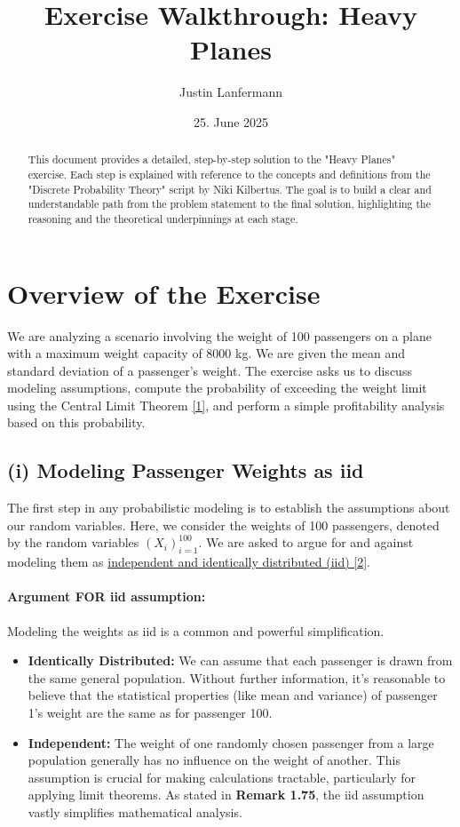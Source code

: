\documentclass[11pt,a4paper]{article}
\title{Exercise Walkthrough: Heavy Planes}
\author{Justin Lanfermann}
\date{25. June 2025}
\begin{document}
\maketitle

\begin{abstract}
    This document provides a detailed, step-by-step solution to the "Heavy Planes" exercise. Each step is explained with reference to the concepts and definitions from the "Discrete Probability Theory" script by Niki Kilbertus. The goal is to build a clear and understandable path from the problem statement to the final solution, highlighting the reasoning and the theoretical underpinnings at each stage.
\end{abstract}

\section*{Overview of the Exercise}
We are analyzing a scenario involving the weight of 100 passengers on a plane with a maximum weight capacity of 8000 kg. We are given the mean and standard deviation of a passenger's weight. The exercise asks us to discuss modeling assumptions, compute the probability of exceeding the weight limit using the Central Limit Theorem \hyperlink{concept:clt}{[1]}, and perform a simple profitability analysis based on this probability.

\subsection*{(i) Modeling Passenger Weights as iid}
The first step in any probabilistic modeling is to establish the assumptions about our random variables. Here, we consider the weights of 100 passengers, denoted by the random variables $(X_i)_{i=1}^{100}$. We are asked to argue for and against modeling them as \hyperlink{concept:iid}{independent and identically distributed (iid) [2]}.

\paragraph{Argument FOR iid assumption:}
Modeling the weights as iid is a common and powerful simplification.
\begin{itemize}
    \item \textbf{Identically Distributed:} We can assume that each passenger is drawn from the same general population. Without further information, it's reasonable to believe that the statistical properties (like mean and variance) of passenger 1's weight are the same as for passenger 100.
    \item \textbf{Independent:} The weight of one randomly chosen passenger from a large population generally has no influence on the weight of another. This assumption is crucial for making calculations tractable, particularly for applying limit theorems. As stated in \textbf{Remark 1.75}, the iid assumption vastly simplifies mathematical analysis.
\end{itemize}
\end{document}
